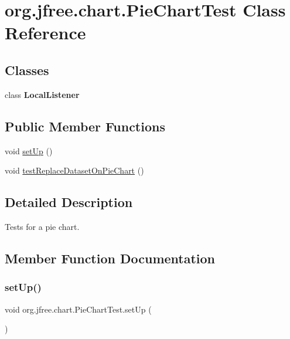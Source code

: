 \hypertarget{classorg_1_1jfree_1_1chart_1_1_pie_chart_test}{}\section{org.\+jfree.\+chart.\+Pie\+Chart\+Test Class Reference}
\label{classorg_1_1jfree_1_1chart_1_1_pie_chart_test}
\subsection*{Classes}
\begin{DoxyCompactItemize}
\item 
class {\bfseries Local\+Listener}
\end{DoxyCompactItemize}
\subsection*{Public Member Functions}
\begin{DoxyCompactItemize}
\item 
void \mbox{\hyperlink{classorg_1_1jfree_1_1chart_1_1_pie_chart_test_a9fe2f85449e684f29dba78f0d86bad05}{set\+Up}} ()
\item 
void \mbox{\hyperlink{classorg_1_1jfree_1_1chart_1_1_pie_chart_test_a97aa7bb0e350991dcfb1e3ae5efdb36f}{test\+Replace\+Dataset\+On\+Pie\+Chart}} ()
\end{DoxyCompactItemize}


\subsection{Detailed Description}
Tests for a pie chart. 

\subsection{Member Function Documentation}
\mbox{\label{classorg_1_1jfree_1_1chart_1_1_pie_chart_test_a9fe2f85449e684f29dba78f0d86bad05}} 
\subsubsection{\texorpdfstring{set\+Up()}{setUp()}}
{\footnotesize\ttfamily void org.\+jfree.\+chart.\+Pie\+Chart\+Test.\+set\+Up (\begin{DoxyParamCaption}{ }\end{DoxyParamCaption})}

